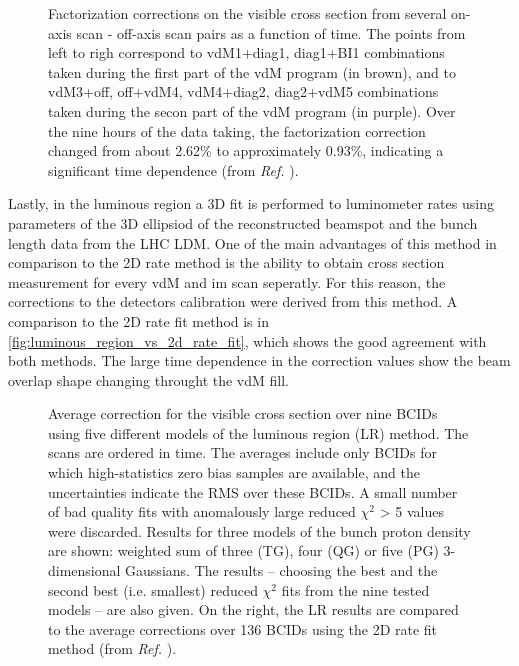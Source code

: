 \begin{figure}[!htb]
	\centering
	\caption[Factorization corrections on visible cross-section from 2D rate fit method]{Factorization corrections on the visible cross section from several on-axis scan - off-axis scan pairs as a function of time. The points from left to righ correspond to vdM1+diag1, diag1+BI1 combinations taken during the first part of the vdM program (in brown), and to vdM3+off, off+vdM4, vdM4+diag2, diag2+vdM5 combinations taken during the secon part of the vdM program (in purple). Over the nine hours of the data taking, the factorization correction changed from about 2.62\% to approximately 0.93\%, indicating a significant time dependence (from \textit{Ref.} \cite{CMS-DP-2024-068}).}
	\label{fig:2d_rate_fit_xsec_corrections}
\end{figure}

Lastly, in the luminous region a 3D fit is performed to luminometer rates using parameters of the 3D ellipsiod of the reconstructed beamspot and the bunch length data from the LHC LDM. One of the main advantages of this method in comparison to the 2D rate method is the ability to obtain cross section measurement for every vdM and im scan seperatly. For this reason, the corrections to the detectors calibration were derived from this method. A comparison to the 2D rate fit method is in \autoref{fig:luminous_region_vs_2d_rate_fit}, which shows the good agreement with both methods. The large time dependence in the correction values show the beam overlap shape changing throught the vdM fill.

\begin{figure}[!htb]
	\centering
	\caption[Factorization corrections on visible cross-section from luminous region method.]{Average correction for the visible cross section over nine BCIDs using five different models of the luminous region (LR) method. The scans are ordered in time. The averages include only BCIDs for which high-statistics zero bias samples are available, and the uncertainties indicate the RMS over these BCIDs. A small number of bad quality fits with anomalously large reduced $\chi^2$ > 5 values were discarded. Results for three models of the bunch proton density are shown: weighted sum of three (TG), four (QG) or five (PG) 3-dimensional Gaussians. The results – choosing the best and the second best (i.e. smallest) reduced $\chi^2$ fits from the nine tested models – are also given. On the right, the LR results are compared to the average corrections over 136 BCIDs using the 2D rate fit method (from \textit{Ref.} \cite{CMS-DP-2024-068}).}
	\label{fig:luminous_region_vs_2d_rate_fit}
\end{figure}

